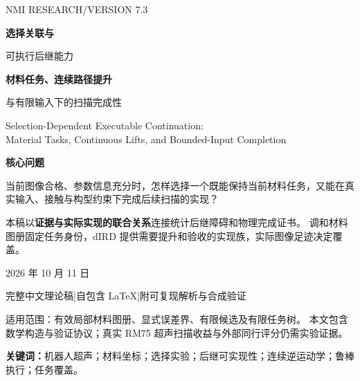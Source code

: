 \documentclass[UTF8,fontset=fandol,zihao=5,a4paper]{ctexart}
\theoremstyle{definition}
\theoremstyle{remark}\newtheorem{remark}[theorem]{说明}
\numberwithin{equation}{section}
\begin{document}
\begin{titlepage}
\vspace*{10mm}
{\Large\sffamily\color{teal}NMI RESEARCH\quad /\quad VERSION 7.3}\par
\vspace{15mm}
{\Huge\bfseries\color{ink}选择关联与\par 可执行后继能力}\par
\vspace{7mm}
{\LARGE\bfseries\color{ink}材料任务、连续路径提升\par 与有限输入下的扫描完成性}\par
\vspace{7mm}
{\large\color{muted}Selection-Dependent Executable Continuation:\\
Material Tasks, Continuous Lifts, and Bounded-Input Completion}\par
\vspace{13mm}
\begin{keybox}
\textbf{核心问题}\par
当前图像合格、参数信息充分时，怎样选择一个既能保持当前材料任务，又能在真实输入、接触与构型约束下完成后续扫描的实现？
\medskip\par
本稿以\textbf{证据与实际实现的联合关系}连接统计后继障碍和物理完成证书。
调和材料图册固定任务身份，dIRD 提供需要提升和验收的实现族，实际图像足迹决定覆盖。
\end{keybox}
\vfill
{\large 2026 年 10 月 11 日}\par
\vspace{3mm}
{\color{muted}完整中文理论稿\quad |\quad 自包含 LaTeX\quad |\quad 附可复现解析与合成验证}\par
\vspace{5mm}
{\small 适用范围：有效局部材料图册、显式误差界、有限候选及有限任务树。
本文包含数学构造与验证协议；真实 RM75 超声扫描收益与外部同行评分仍需实验证据。}
\end{titlepage}

\begin{abstract}
任务兼容的探头位姿通常形成连续实现族。当前成像质量和参数信息并不能单独决定执行后还剩哪些任务可完成：同一证据被关联到不同的持久构型，会改变可用声窗、输入方向和返回成本。本稿在 V7.1--V7.2 的选择实验基础上建立可执行后继能力的明确模型。首先保留两模式相交剩余实验的正测度刻画和短接矩阵判据，并把错误后继的精确障碍推进到含开集的紧参数域：其最小总变差误差严格为正；对固定独立加性噪声端口给出单独的闭性证明。其次，使用基于调和场的局部材料图册构造共享解剖参数、真实切片灵敏度和任务足迹，通过经过验证的连续逆运动学提升及鲁棒执行管检查有限输入、接触、姿态与构型连接。有限观测分支树把这些局部不等式组合为同一因果策略的安全与后续材料覆盖保证。最后给出具有严格行程和速度限制的连续机构：在对称任务分布下，两程序具有相同当前响应、相同证据与模式边际，证据与模式配对的差异却产生严格的后续完成率间隙；错误分支即使随后获得真值，也必须支付由构型几何决定的恢复时间。所有数值结果均标明为解析或合成验证，学习式 dIRD 分数和离散验收结果不直接充当连续执行证书。
\end{abstract}
\noindent\textbf{关键词：}机器人超声；材料坐标；选择实验；后继可实现性；连续逆运动学；鲁棒执行；任务覆盖。
\clearpage\setcounter{tocdepth}{1}\tableofcontents\clearpage
\end{document}
